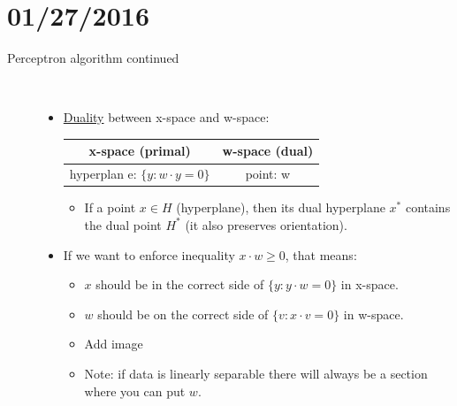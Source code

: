 \documentclass[10pt]{article}
\begin{document}
\section*{01/27/2016}
\begin{description}
	\item[Perceptron algorithm continued]
	\
		\begin{itemize}
			\item \underline{Duality} between x-space and w-space:\\
				\begin{center}
					\begin{tabular}{ c|c}
  						x-space (primal) & w-space (dual) \\
  						\hline
  						hyperplan	e: $\{y: w \cdot y = 0\}$ & point: w \\
  						\hline
					\end{tabular}
				\end{center}
				\begin{itemize}
					\item If a point $x \in H$ (hyperplane), then its dual hyperplane $x^{*}$ contains the dual point $H^{*}$ (it also preserves orientation).
				\end{itemize}
			
			\item If we want to enforce inequality $x \cdot w \geq 0$, that means:
				\begin{itemize}
					\item $x$ should be in the correct side of $\{y: y \cdot w = 0\}$ in x-space.
					\item $w$ should be on the correct side of $\{v: x \cdot v = 0\}$ in w-space.
					\item Add image
					\item Note: if data is linearly separable there will always be a section where you can put $w$.
				\end{itemize}
		\end{itemize}


\end{description}
\end{document}
